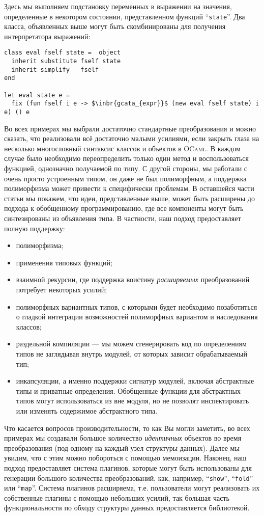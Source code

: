 Здесь мы выполняем подстановку переменных в выражении на значения, определенные в некотором состоянии, представленном функций ``\lstinline{state}''. Два класса, объявленных выше могут быть скомбинированы для получения интерпретатора выражений:

\begin{lstlisting}
class eval fself state =  object
  inherit substitute fself state
  inherit simplify   fself
end

let eval state e =
  fix (fun fself i e -> $\inbr{gcata_{expr}}$ (new eval fself state) i e) () e  
\end{lstlisting}

Во всех примерах мы выбрали достаточно стандартные преобразования и можно сказать, что реализовали всё достаточно малыми усилиями,
если закрыть глаза на несколько многословный синтаксис классов и объектов в  \textsc{OCaml}. В каждом случае было необходимо переопределить
только один метод и воспользоваться функцией, однозначно получаемой по типу. 
С другой стороны, мы работали с очень просто устроенным типом, он даже не был полиморфным, а поддержка полиморфизма может привести к 
специфически проблемам. В оставшейся части статьи мы покажем, что идеи, представленные выше, может быть расширены до подхода к обобщенному программированию, где все компоненты могут быть синтезированы из объявления типа. В частности, наш подход предоставляет полную поддержку:

\begin{itemize}
\item полиморфизма;
\item применения типовых функций;
\item взаимной рекурсии, где поддержка воистину \emph{расширяемых} преобразований потребует некоторых усилий;
\item полиморфных вариантных типов, с которыми будет необходимо позаботиться о гладкой интеграции возможностей полиморфных вариантом и наследования классов;
\item раздельной компиляции --- мы можем сгенерировать код по определениям типов не заглядывая внутрь модулей, от которых зависит обрабатываемый тип;
\item инкапсуляции, а именно поддержки сигнатур модулей, включая абстрактные типы и приватные определения. Обобщенные функции для абстрактных типов могут использоваться из вне модуля, но не позволят инспектировать или изменять содержимое абстрактного типа.
\end{itemize}

Что касается вопросов производительности, то как Вы могли заметить, во всех примерах мы создавали большое количество 
\emph{идентичных} объектов во время преобразования (под одному на каждый узел структуры данных). Далее мы увидим, что с этим можно побороться
с помощью мемоизации. Наконец, наш подход предоставляет система плагинов, которые могут быть использованы для генерации большого количества преобразований, как, например, ``\lstinline{show}'', ``\lstinline{fold}'' или ``\lstinline{map}''. Система плагинов расширяема, т.е. пользователи могут  реализовать их собственные плагины с помощью небольших усилий, так большая часть функциональности по обходу структуры данных предоставляется библиотекой. 
